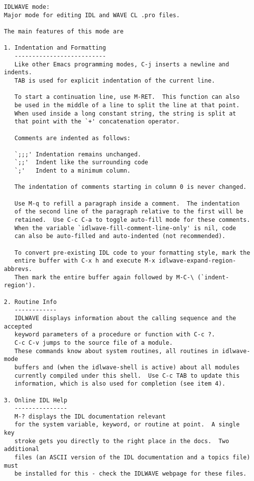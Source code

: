 \begin{verbatim}
IDLWAVE mode:
Major mode for editing IDL and WAVE CL .pro files.

The main features of this mode are

1. Indentation and Formatting
   --------------------------
   Like other Emacs programming modes, C-j inserts a newline and indents.
   TAB is used for explicit indentation of the current line.

   To start a continuation line, use M-RET.  This function can also
   be used in the middle of a line to split the line at that point.
   When used inside a long constant string, the string is split at
   that point with the `+' concatenation operator.

   Comments are indented as follows:

   `;;;' Indentation remains unchanged.
   `;;'  Indent like the surrounding code
   `;'   Indent to a minimum column.

   The indentation of comments starting in column 0 is never changed.

   Use M-q to refill a paragraph inside a comment.  The indentation
   of the second line of the paragraph relative to the first will be
   retained.  Use C-c C-a to toggle auto-fill mode for these comments.
   When the variable `idlwave-fill-comment-line-only' is nil, code
   can also be auto-filled and auto-indented (not recommended).

   To convert pre-existing IDL code to your formatting style, mark the
   entire buffer with C-x h and execute M-x idlwave-expand-region-abbrevs.
   Then mark the entire buffer again followed by M-C-\ (`indent-region').

2. Routine Info
   ------------
   IDLWAVE displays information about the calling sequence and the accepted
   keyword parameters of a procedure or function with C-c ?.
   C-c C-v jumps to the source file of a module.
   These commands know about system routines, all routines in idlwave-mode
   buffers and (when the idlwave-shell is active) about all modules
   currently compiled under this shell.  Use C-c TAB to update this
   information, which is also used for completion (see item 4).

3. Online IDL Help
   ---------------
   M-? displays the IDL documentation relevant
   for the system variable, keyword, or routine at point.  A single key
   stroke gets you directly to the right place in the docs.  Two additional
   files (an ASCII version of the IDL documentation and a topics file) must
   be installed for this - check the IDLWAVE webpage for these files.


\end{verbatim}
